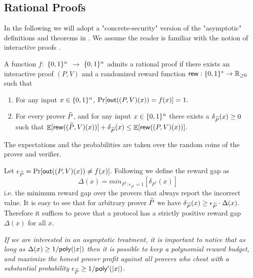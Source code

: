 \subsection{Rational Proofs}

In the following we will adopt a "concrete-security" version of the "asymptotic" definitions and theorems in \cite{am1,ratargs}. We assume the reader is familiar with the notion of interactive proofs \cite{gmr}. 

\noindent
\begin{definition}
\label{def:RP-delta}
\label{def:RP}
A function $f:$ $\{0, 1\}^n$ $\to$ $\{0, 1\}^n$ admits a rational proof if there exists an interactive proof $(P,V)$ and a randomized reward function
$\mathsf{rew} : \{0, 1\}^{*} \to \mathbb{R}_{\geq 0}$ such that

\begin{enumerate}
\item For any input $x \in 
\{0, 1\}^n$, $\Pr[\mathsf{out}((P,V)(x)) = f(x)] = 1.$

\item For every prover $\widetilde{P}$, and for any input $x \in 
\{0, 1\}^n$ there exists a $\delta_{\widetilde{P}}(x) \geq 0$ such that 
$ \mathop{\mathbb{E}}[\mathsf{rew}((\widetilde{P},V)(x))] + \delta_{\widetilde{P}}(x) \leq \mathop{\mathbb{E}}[\mathsf{rew}((P,V)(x))]. $
\end{enumerate}
The expectations and the probabilities are taken over the random coins of the prover and verifier.
\end{definition} 


\medskip
\noindent
Let $\epsilon_{\widetilde{P}} = \Pr[\mathsf{out}((P,V)(x)) \neq f(x)]$. 
Following \cite{ratargs} we define the {\sf reward gap} as 
\[ \Delta(x) = min_{P^* : \epsilon_{P^*}=1}[\delta_{P^*}(x)]  \]
i.e. the minimum reward gap over the provers that always report the incorrect value. 
It is easy to see that for arbitrary prover $\widetilde{P}$ we have $\delta_{\widetilde{P}}(x) \geq 
\epsilon_{\widetilde{P}} \cdot \Delta(x)$. Therefore it suffices to prove that a protocol has 
a strictly positive reward gap $\Delta(x)$ for all $x$. 


\begin{myrem}
\label{rem:asy}
{\em If we are interested in an asymptotic treatment, it is important to notice that as long as $\Delta(x) \geq 1/{\sf poly}(|x|)$ then it is possible to keep a polynomial reward budget, and maximize the honest prover profit against all provers who cheat with a substantial probability $\epsilon_{\widetilde{P}} \geq 1/{\sf poly'}(|x|)$.}
\end{myrem}

